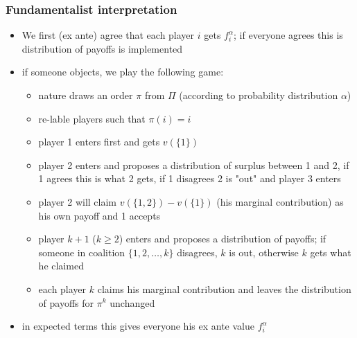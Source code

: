 \documentclass[11pt,english]{beamer}
\begin{document}
\begin{frame}[allowframebreaks]\frametitle{Fundamentalist interpretation}
  \begin{itemize}
  \item We first (ex ante) agree that each player $i$ gets
    $f_i^{\alpha}$; if everyone agrees this is distribution of payoffs
    is implemented
  \item if someone objects, we play the following game:
    \begin{itemize}
    \item nature draws an order $\pi$ from $\Pi$ (according to
      probability distribution $\alpha$)
    \item re-lable players such that $\pi(i) = i$
    \item player 1 enters first and gets $v(\{1\})$
    \item player 2 enters and proposes a distribution of surplus
      between 1 and 2, if 1 agrees this is what 2 gets, if 1 disagrees
      2 is "out" and player 3 enters
    \item player 2 will claim $v(\{1,2\})-v(\{1\})$ (his marginal
      contribution) as his own payoff and 1 accepts
    \item player $k+1$ ($k \geq 2$) enters and proposes a distribution
      of payoffs; if someone in coalition $\{1,2,\ldots,k\}$
      disagrees, $k$ is out, otherwise $k$ gets what he claimed
    \item each player $k$ claims his marginal contribution and leaves
      the distribution of payoffs for $\pi^k$ unchanged
    \end{itemize} %
  \item in expected terms this gives everyone his ex ante value $f_i^{\alpha}$
  \end{itemize} %
\end{frame}
\end{document}
